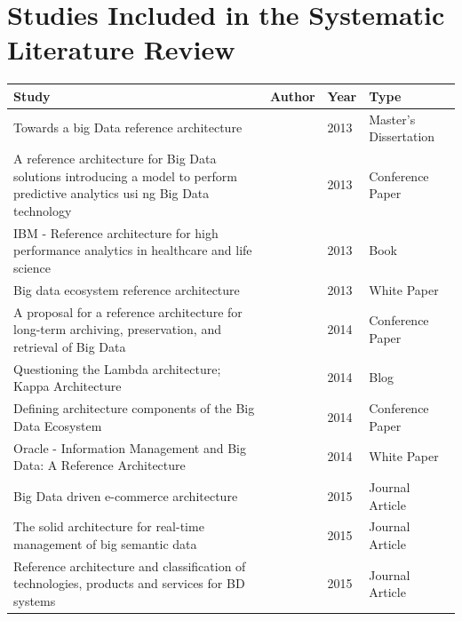 \documentclass[review]{elsarticle}
\begin{document}


\appendix

\section{Studies Included in the Systematic Literature Review} \label{appendixA:SLR}
\begin{longtable}{|p{5cm} | p{1cm}  | p{1cm} | p{3.4cm}|}
    \hline
    Study  & Author & Year & Type \\ [0.5ex]
    \hline
    Towards a big Data reference architecture  & \cite{Maier}& 2013 & Master's Dissertation \\
    \hline
    A reference architecture for Big Data solutions introducing a model to perform predictive analytics usi ng Big Data technology  & \cite{geerdink2013reference}  & 2013 & Conference Paper \\
    \hline
    IBM - Reference architecture for high performance analytics in healthcare and life science  & \cite{quintero2019ibm} & 2013 & Book \\ [1ex]
    \hline
    Big data ecosystem reference architecture  &
    \cite{levin2013big} & 2013 & White Paper \\ [1ex]
    \hline
    A proposal for a reference architecture for long-term archiving, preservation, and retrieval of Big Data  & \cite{viana2014proposal}  & 2014 & Conference Paper \\
    \hline
    Questioning the Lambda architecture; Kappa Architecture  & \cite{kreps2014questioning}  & 2014 & Blog \\
    \hline
    Defining architecture components of the Big Data Ecosystem  & \cite{demchenko2014defining} & 2014 & Conference Paper   \\ [1ex]
    \hline
    Oracle - Information Management and Big Data: A Reference Architecture   &
    \cite{cackett2013information} & 2014 & White Paper \\ [1ex]
    \hline
    Big Data driven e-commerce architecture   & \cite{ghandour2015big} & 2015 & Journal Article \\ [1ex]
    \hline
    The solid architecture for real-time management of big semantic data & \cite{martinez2015solid} & 2015 &  Journal Article \\ [1ex]
    \hline
    Reference architecture and classification of technologies, products and services for BD systems  & \cite{paakkonen2015reference}  & 2015 & Journal Article \\ [1ex]

\end{longtable}
\end{document}
